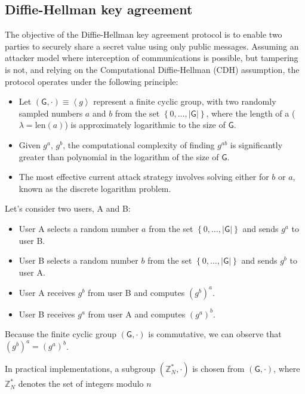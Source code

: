 \subsection{Diffie-Hellman key agreement}
The objective of the Diffie-Hellman key agreement protocol is to enable two parties to securely share a secret value using only public messages.
Assuming an attacker model where interception of communications is possible, but tampering is not, and relying on the Computational Diffie-Hellman (CDH) assumption, the protocol operates under the following principle:
\begin{itemize}
    \item Let $\left(\mathsf{G},\cdot\right)\equiv \left\langle g \right\rangle $ represent a finite cyclic group, with two randomly sampled numbers $a$ and $b$ from the set $\left\{ 0,\dots,\left\lvert \mathsf{G} \right\rvert  \right\}$, where the length of a ($\lambda = \text{len}(a)$) is approximately logarithmic to the size of $\mathsf{G}$.
    \item Given $g^a$, $g^b$, the computational complexity of finding $g^{ab}$ is significantly greater than polynomial in the logarithm of the size of $\mathsf{G}$.
    \item The most effective current attack strategy involves solving either for $b$ or $a$, known as the discrete logarithm problem.
\end{itemize}
\begin{example}
    Let's consider two users, A and B:
    \begin{itemize}
        \item User A selects a random number $a$  from the set  $\left\{ 0,\dots,\left\lvert \mathsf{G} \right\rvert  \right\}$ and sends $g^a$ to user B. 
        \item User B selects a random number $b$  from the set  $\left\{ 0,\dots,\left\lvert \mathsf{G} \right\rvert  \right\}$ and sends $g^b$ to user A. 
        \item User A receives $g^b$ from user B and computes $\left(g^b\right)^a$. 
        \item User B receives $g^a$ from user A and computes $\left(g^a\right)^b$. 
    \end{itemize}
    Because the finite cyclic group $\left(\mathsf{G},\cdot\right)$ is commutative, we can observe that $\left(g^b\right)^a=\left(g^a\right)^b$. 
\end{example}
In practical implementations, a subgroup $\left(\mathbb{Z}_N^\ast,\cdot\right)$  is chosen from $\left(\mathsf{G},\cdot\right)$, where $\mathbb{Z}_N^\ast$ denotes the set of integers modulo $n$ 

